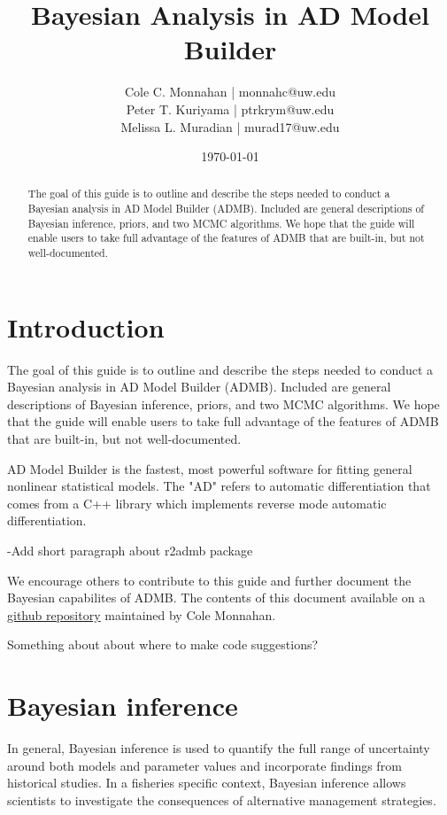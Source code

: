 \documentclass{article}\usepackage[]{graphicx}\usepackage[]{color}
\begin{document}
\title{Bayesian Analysis in AD Model Builder}
\author{Cole C. Monnahan | monnahc@uw.edu \\
Peter T. Kuriyama | ptrkrym@uw.edu \\
Melissa L. Muradian | murad17@uw.edu}

\date{\today{}}
\maketitle
\begin{abstract}
  The goal of this guide is to outline and describe the steps needed to conduct a Bayesian analysis in AD 
  Model Builder (ADMB). Included are general descriptions of Bayesian inference, priors, and two MCMC algorithms. We
  hope that the guide will enable users to take full advantage of the features of ADMB that are built-in,
  but not well-documented.
  
\end{abstract}

\tableofcontents

\section{Introduction}

  The goal of this guide is to outline and describe the steps needed to conduct a Bayesian analysis in AD 
  Model Builder (ADMB). Included are general descriptions of Bayesian inference, priors, and two MCMC algorithms. We
  hope that the guide will enable users to take full advantage of the features of ADMB that are built-in,
  but not well-documented.

  AD Model Builder is the fastest, most powerful software for fitting general nonlinear statistical models.
  The "AD" refers to automatic differentiation that comes from a C++ library which implements reverse mode 
  automatic differentiation. 
  
-Add short paragraph about r2admb package

  We encourage others to contribute to this guide and further document the Bayesian capabilites of ADMB.
  The contents of this document available on a \href{https://github.com/colemonnahan/admb_guide}{github
  repository} maintained by Cole Monnahan. 
  
  Something about about where to make code suggestions?
  
  
\section{Bayesian inference}
In general, Bayesian inference is used to quantify the full
range of uncertainty around both models and parameter values
and incorporate findings from historical studies. In a
fisheries specific context, Bayesian inference allows
scientists to investigate the consequences of alternative
management strategies.
\end{document}
